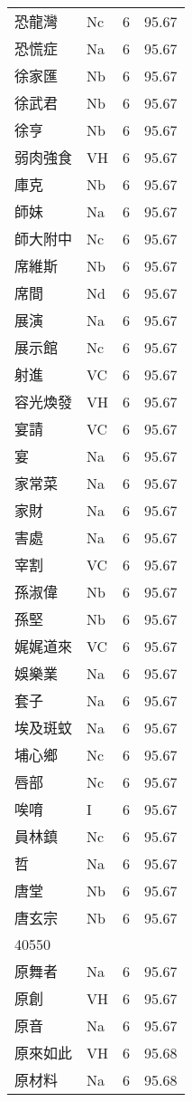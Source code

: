 \documentclass[twocolumn]{book}
\begin{document}
\begin{supertabular}{llrr}
恐龍灣 & Nc & 6 &  95.67\\
恐慌症 & Na & 6 &  95.67\\
徐家匯 & Nb & 6 &  95.67\\
徐武君 & Nb & 6 &  95.67\\
徐亨 & Nb & 6 &  95.67\\
弱肉強食 & VH & 6 &  95.67\\
庫克 & Nb & 6 &  95.67\\
師妹 & Na & 6 &  95.67\\
師大附中 & Nc & 6 &  95.67\\
席維斯 & Nb & 6 &  95.67\\
席間 & Nd & 6 &  95.67\\
展演 & Na & 6 &  95.67\\
展示館 & Nc & 6 &  95.67\\
射進 & VC & 6 &  95.67\\
容光煥發 & VH & 6 &  95.67\\
宴請 & VC & 6 &  95.67\\
宴 & Na & 6 &  95.67\\
家常菜 & Na & 6 &  95.67\\
家財 & Na & 6 &  95.67\\
害處 & Na & 6 &  95.67\\
宰割 & VC & 6 &  95.67\\
孫淑偉 & Nb & 6 &  95.67\\
孫堅 & Nb & 6 &  95.67\\
娓娓道來 & VC & 6 &  95.67\\
娛樂業 & Na & 6 &  95.67\\
套子 & Na & 6 &  95.67\\
埃及斑蚊 & Na & 6 &  95.67\\
埔心鄉 & Nc & 6 &  95.67\\
唇部 & Nc & 6 &  95.67\\
唉唷 & I & 6 &  95.67\\
員林鎮 & Nc & 6 &  95.67\\
哲 & Na & 6 &  95.67\\
唐堂 & Nb & 6 &  95.67\\
唐玄宗 & Nb & 6 &  95.67\\
40550\\
原舞者 & Na & 6 &  95.67\\
原創 & VH & 6 &  95.67\\
原音 & Na & 6 &  95.67\\
原來如此 & VH & 6 &  95.68\\
原材料 & Na & 6 &  95.68\\

\end{supertabular}
\end{document}
